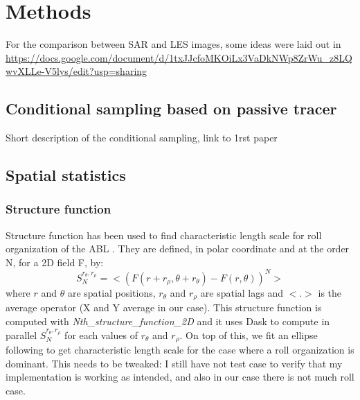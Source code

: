 \documentclass[draft]{agujournal2019} %
\begin{document}
        \section{Methods}
        \label{section_methods}

            For the comparison between SAR and LES images, some ideas were laid out in  \url{https://docs.google.com/document/d/1txJJcfoMKOiLx3VaDkNWp8ZrWu_z8LQwvXLLe-V5lys/edit?usp=sharing}

            \subsection{Conditional sampling based on passive tracer}
            \label{subsection_C10_description}
            Short description of the conditional sampling, link to 1rst paper

            \subsection{Spatial statistics}
            \label{subsection_SpatialStats}

                \subsubsection{Structure function}
                \label{subsubsection_structure_function}

                Structure function \cite{granero_belinchon_two-dimensional_2022} has been used to find characteristic length scale for roll organization of the ABL \cite{brilouet_trade_2023}. They are defined, in polar coordinate and at the order N, for a 2D field F, by:
                \begin{equation}
                    S_N^{r_{\theta},r_{\rho}} = < (F(r + r_{\rho}, \theta + r_{\theta} ) - F(r , \theta))^N >
                \end{equation}
                where $r$ and $\theta$ are spatial positions, $r_{\theta}$ and $r_{\rho}$ are spatial lags and $<$.$>$ is the average operator (X and Y average in our case). This structure function is computed with \textit{Nth\_structure\_function\_2D} and it uses Dask to compute in parallel $S_N^{r_{\theta},r_{\rho}}$ for each values of $r_{\theta}$ and $r_{\rho}$. On top of this, we fit an ellipse following  to get characteristic length scale for the case where a roll organization is dominant. This needs to be tweaked: I still have not test case to verify that my implementation is working as intended, and also in our case there is not much roll case.
\end{document}
